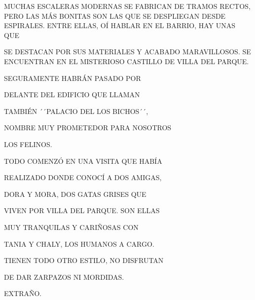 
\newpage
{}
MUCHAS ESCALERAS MODERNAS SE FABRICAN DE TRAMOS RECTOS, PERO LAS MÁS BONITAS SON LAS QUE SE DESPLIEGAN DESDE ESPIRALES. ENTRE ELLAS, OÍ HABLAR EN EL BARRIO, HAY UNAS QUE 
\vspace{.5\paperheight}


SE DESTACAN POR SUS MATERIALES Y ACABADO MARAVILLOSOS. SE ENCUENTRAN EN EL MISTERIOSO CASTILLO DE VILLA DEL PARQUE.

\newpage
{}
SEGURAMENTE HABRÁN PASADO POR 

DELANTE DEL EDIFICIO QUE LLAMAN

TAMBIÉN ´´PALACIO DEL LOS BICHOS´´,

NOMBRE MUY PROMETEDOR PARA NOSOTROS

LOS FELINOS. 

TODO COMENZÓ EN UNA VISITA QUE HABÍA 

REALIZADO DONDE CONOCÍ A DOS AMIGAS, 

DORA Y MORA, DOS GATAS GRISES QUE

VIVEN POR VILLA DEL PARQUE. 
SON ELLAS 

MUY TRANQUILAS Y 
CARIÑOSAS  CON 

TANIA
Y CHALY, 
LOS HUMANOS A CARGO. 

TIENEN TODO OTRO ESTILO, NO 
DISFRUTAN 

DE DAR ZARPAZOS NI 
MORDIDAS.

EXTRAÑO.

